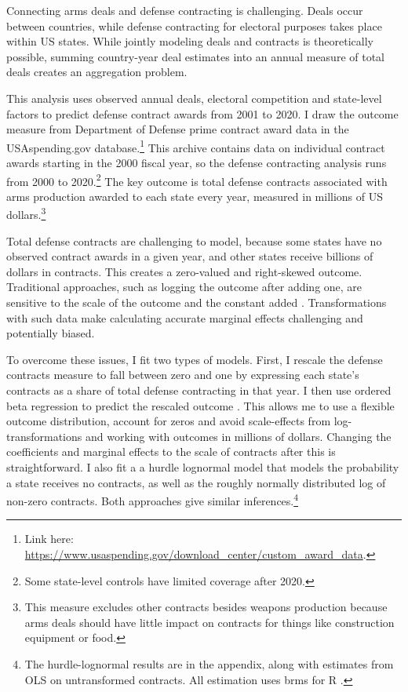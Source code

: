 \documentclass[12pt]{article}
\begin{document}
Connecting arms deals and defense contracting is challenging. 
Deals occur between countries, while defense contracting for electoral purposes takes place within US states.
While jointly modeling deals and contracts is theoretically possible, summing country-year deal estimates into an annual measure of total deals creates an aggregation problem.%


This analysis uses observed annual deals, electoral competition and state-level factors to predict defense contract awards from 2001 to 2020. 
I draw the outcome measure from Department of Defense prime contract award data in the USAspending.gov database.\footnote{Link here: \url{https://www.usaspending.gov/download_center/custom_award_data}.} 
This archive contains data on individual contract awards starting in the 2000 fiscal year, so the defense contracting analysis runs from 2000 to 2020.\footnote{Some state-level controls have limited coverage after 2020.}
The key outcome is total defense contracts associated with arms production awarded to each state every year, measured in millions of US dollars.\footnote{This measure excludes other contracts besides weapons production because arms deals should have little impact on contracts for things like construction equipment or food.}


Total defense contracts are challenging to model, because some states have no observed contract awards in a given year, and other states receive billions of dollars in contracts. 
This creates a zero-valued and right-skewed outcome. 
Traditional approaches, such as logging the outcome after adding one, are sensitive to the scale of the outcome and the constant added \citep{ChenRoth2022, MullahyNorton2022}. 
Transformations with such data make calculating accurate marginal effects challenging and potentially biased. 


To overcome these issues, I fit two types of models.
First, I rescale the defense contracts measure to fall between zero and one by expressing each state's contracts as a share of total defense contracting in that year.
I then use ordered beta regression to predict the rescaled outcome \citep{Kubinec2022}. 
This allows me to use a flexible outcome distribution, account for zeros and avoid scale-effects from log-transformations and working with outcomes in millions of dollars. 
Changing the coefficients and marginal effects to the scale of contracts after this is straightforward. 
I also fit a a hurdle lognormal model that models the probability a state receives no contracts, as well as the roughly normally distributed log of non-zero contracts. 
Both approaches give similar inferences.\footnote{The hurdle-lognormal results are in the appendix, along with estimates from OLS on untransformed contracts. All estimation uses brms for \textsf{R} \citep{Buerkner2017}.} 
\end{document}
